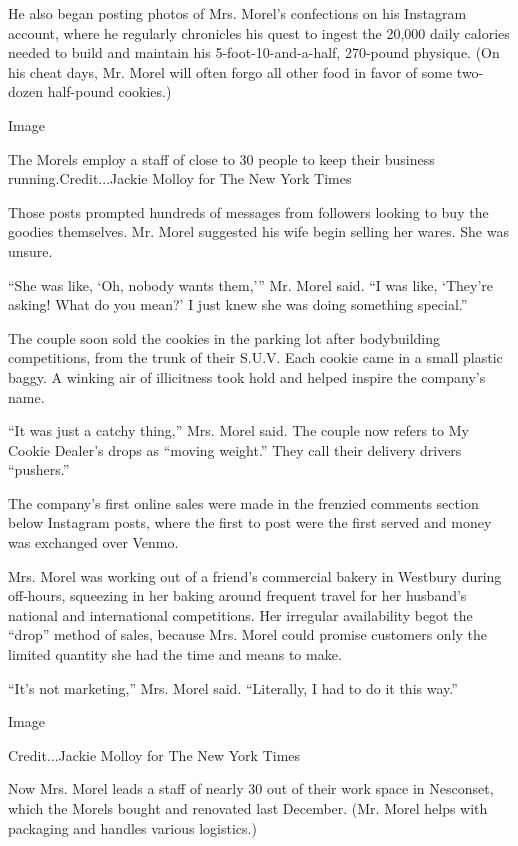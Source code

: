 He also began posting photos of Mrs. Morel's confections on his
Instagram account, where he regularly chronicles his quest to ingest the
20,000 daily calories needed to build and maintain his
5-foot-10-and-a-half, 270-pound physique. (On his cheat days, Mr. Morel
will often forgo all other food in favor of some two-dozen half-pound
cookies.)

Image

The Morels employ a staff of close to 30 people to keep their business
running.Credit...Jackie Molloy for The New York Times

Those posts prompted hundreds of messages from followers looking to buy
the goodies themselves. Mr. Morel suggested his wife begin selling her
wares. She was unsure.

``She was like, `Oh, nobody wants them,''' Mr. Morel said. ``I was like,
`They're asking! What do you mean?' I just knew she was doing something
special.''

The couple soon sold the cookies in the parking lot after bodybuilding
competitions, from the trunk of their S.U.V. Each cookie came in a small
plastic baggy. A winking air of illicitness took hold and helped inspire
the company's name.

``It was just a catchy thing,'' Mrs. Morel said. The couple now refers
to My Cookie Dealer's drops as ``moving weight.'' They call their
delivery drivers ``pushers.''

The company's first online sales were made in the frenzied comments
section below Instagram posts, where the first to post were the first
served and money was exchanged over Venmo.

Mrs. Morel was working out of a friend's commercial bakery in Westbury
during off-hours, squeezing in her baking around frequent travel for her
husband's national and international competitions. Her irregular
availability begot the ``drop'' method of sales, because Mrs. Morel
could promise customers only the limited quantity she had the time and
means to make.

``It's not marketing,'' Mrs. Morel said. ``Literally, I had to do it
this way.''

Image

Credit...Jackie Molloy for The New York Times

Now Mrs. Morel leads a staff of nearly 30 out of their work space in
Nesconset, which the Morels bought and renovated last December. (Mr.
Morel helps with packaging and handles various logistics.)

